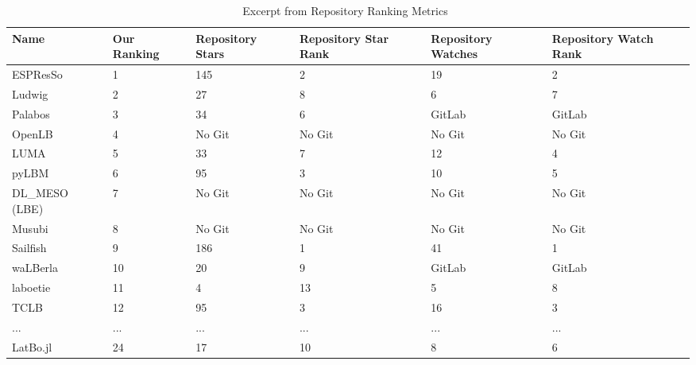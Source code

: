 \documentclass[runningheads]{llncs}
\begin{document}
\begin{table}[!h]
	\begin{center}
		\begin{tabular}{ p{3cm}p{1.25cm}p{1.75cm}p{1.75cm}p{1.75cm}p{1.75cm} }
			\toprule
			Name & Our Ranking & Repository Stars & Repository Star Rank &
			Repository Watches & Repository Watch Rank\\
			\midrule
			ESPResSo & 1 & 145 & 2 & 19& 2\\
			Ludwig & 2 & 27 & 8 & 6& 7\\
			Palabos & 3 & 34 & 6 & GitLab& GitLab\\
			OpenLB & 4 & No Git & No Git & No Git& No Git\\
			LUMA & 5 & 33 & 7 & 12& 4\\
			pyLBM & 6 & 95 & 3 & 10& 5\\
			DL\_MESO (LBE) & 7 & No Git & No Git & No Git & No Git\\
			Musubi & 8 & No Git & No Git & No Git & No Git\\
			Sailfish & 9 & 186 & 1 & 41& 1\\
			waLBerla & 10 & 20 & 9 & GitLab& GitLab\\
			laboetie & 11 & 4 & 13 & 5& 8\\
			TCLB & 12 & 95 & 3 & 16& 3\\
			... & ... & ... & ... & ... & ...\\				
			LatBo.jl & 24 & 17 & 10 & 8& 6\\			
			\bottomrule
		\end{tabular}
		\caption{Excerpt from Repository Ranking Metrics~\cite{Michalski2021}}
		\label{repometrics}
	\end{center}
	\end{table}
\end{document}
